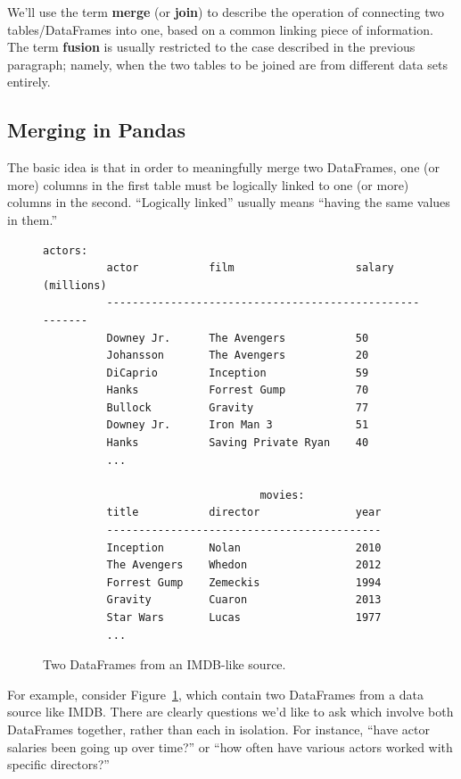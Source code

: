 We'll use the term \textbf{merge} (or \textbf{join}) to describe the operation
of connecting two tables/DataFrames into one, based on a common linking piece
of information. The term \textbf{fusion} is usually restricted to the case
described in the previous paragraph; namely, when the two tables to be joined
are from different data sets entirely.

\subsection{Merging in Pandas}

The basic idea is that in order to meaningfully merge two DataFrames, one (or
more) columns in the first table must be logically linked to one (or more)
columns in the second. ``Logically linked'' usually means ``having the same
values in them.'' 

\label{originalDFs}
\begin{figure}[ht]
\centering
\begin{Verbatim}[fontsize=\small,samepage=true,frame=none]
                                  actors:
          actor           film                   salary (millions)
          --------------------------------------------------------
          Downey Jr.      The Avengers           50
          Johansson       The Avengers           20
          DiCaprio        Inception              59
          Hanks           Forrest Gump           70
          Bullock         Gravity                77
          Downey Jr.      Iron Man 3             51
          Hanks           Saving Private Ryan    40
          ...
          
                                  movies:
          title           director               year
          -------------------------------------------
          Inception       Nolan                  2010
          The Avengers    Whedon                 2012
          Forrest Gump    Zemeckis               1994
          Gravity         Cuaron                 2013
          Star Wars       Lucas                  1977
          ...
\end{Verbatim}
\caption{Two DataFrames from an IMDB-like source.}
\label{fig:imdb}
\end{figure}
 
For example, consider Figure~\ref{fig:imdb}, which contain two DataFrames from
a data source like IMDB. There are clearly questions we'd like to ask which
involve both DataFrames together, rather than each in isolation. For instance,
``have actor salaries been going up over time?'' or ``how often have various
actors worked with specific directors?''


